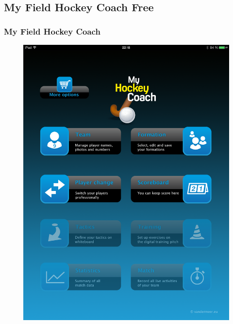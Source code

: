 \documentclass{beamer}
\begin{document}
\subsection{My Field Hockey Coach Free}
\begin{frame}
\frametitle{My Field Hockey Coach}
  \begin{figure}[H]
    \includegraphics[height=.8\textheight]{img/IMG_0019}
    \label{pic:myfieldhockeycoachfree}
  \end{figure}
\end{frame}
\end{document}
